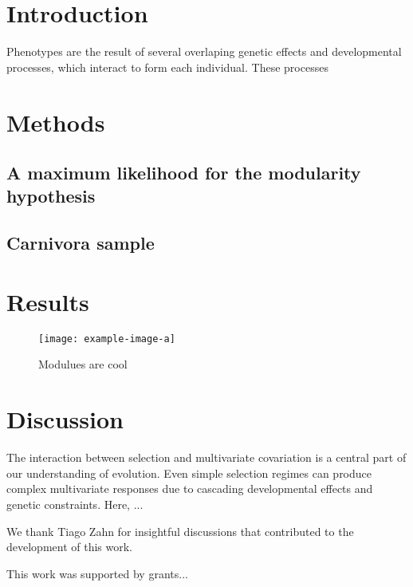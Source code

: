 \section*{Introduction}

Phenotypes are the result of several overlaping genetic effects and developmental processes, which
interact to form each individual\citep{Lande1983-ez,Klingenberg2008-ll,Melo2016-yw}. These processes 


\section*{Methods}

\subsection*{A maximum likelihood for the modularity hypothesis}

\subsection*{Carnivora sample}


\section*{Results}


\begin{figure}
\texttt{[image: example-image-a]}
\caption[Factors and modules]{ Modulues are cool }
\label{fig:joh:manhatan}
\end{figure}



\section*{Discussion}

The interaction between selection and multivariate covariation is a
central part of our understanding of evolution. Even simple selection
regimes can produce complex multivariate responses due to cascading
developmental effects and genetic constraints. Here, ...


\begin{notes}[Acknowledgments]
We thank Tiago Zahn for insightful discussions that contributed to the
development of this work.
\end{notes}

\begin{notes}[Funding]
This work was supported by grants...
\end{notes}
